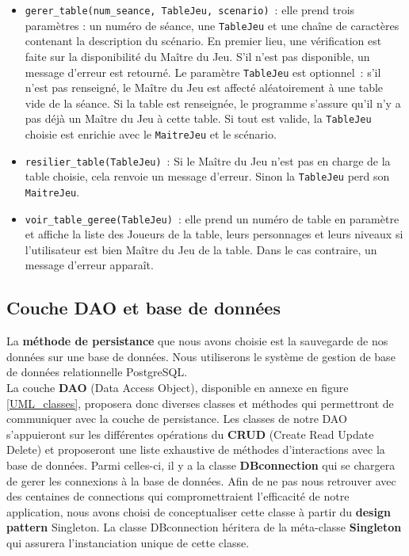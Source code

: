 \documentclass[11pt]{article}
\begin{document}
\begin{itemize}[label=, font=\small]
    \item \texttt{gerer\_table(num\_seance, TableJeu, scenario)}~: elle prend trois paramètres : un numéro de séance, une \texttt{TableJeu} et une chaîne de caractères contenant la description du scénario. En premier lieu, une vérification est faite sur la disponibilité du Maître du Jeu. S'il n'est pas disponible, un message d'erreur est retourné. Le paramètre \texttt{TableJeu} est optionnel~: s'il n'est pas renseigné, le Maître du Jeu est affecté aléatoirement à une table vide de la séance. Si la table est renseignée, le programme s'assure qu'il n'y a pas déjà un Maître du Jeu à cette table. Si tout est valide, la \texttt{TableJeu} choisie est enrichie avec le \texttt{MaitreJeu} et le scénario.
    
    \item \texttt{resilier\_table(TableJeu)}~: Si le Maître du Jeu n'est pas en charge de la table choisie, cela renvoie un message d'erreur. Sinon la \texttt{TableJeu} perd son \texttt{MaitreJeu}.
    
    \item \texttt{voir\_table\_geree(TableJeu)}~: elle prend un numéro de table en paramètre et affiche la liste des Joueurs de la table, leurs personnages et leurs niveaux si l'utilisateur est bien Maître du Jeu de la table. Dans le cas contraire, un message d'erreur apparaît.
\end{itemize}





\subsection{Couche DAO et base de données}

La \textbf{méthode de persistance} que nous avons choisie est la sauvegarde de nos données sur une base de données. Nous utiliserons le système de gestion de base de données relationnelle PostgreSQL.\\

La couche \textbf{DAO} (Data Access Object), disponible en annexe en figure \ref{UML_classes}, proposera donc diverses classes et méthodes qui permettront de communiquer avec la couche de persistance. Les classes de notre DAO s'appuieront sur les différentes opérations du \textbf{CRUD} (Create Read Update Delete) et proposeront une liste exhaustive de méthodes d'interactions avec la base de données. Parmi celles-ci, il y a la classe \textbf{DBconnection} qui se chargera de gerer les connexions à la base de données. Afin de ne pas nous retrouver avec des centaines de connections qui compromettraient l'efficacité de notre application, nous avons choisi de conceptualiser cette classe à partir du \textbf{design pattern} Singleton. La classe DBconnection héritera de la méta-classe \textbf{Singleton} qui assurera l'instanciation unique de cette classe.
\end{document}
